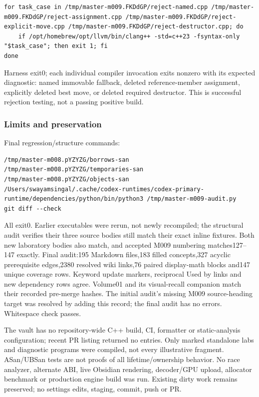 \begin{verbatim}
for task_case in /tmp/master-m009.FKDdGP/reject-named.cpp /tmp/master-m009.FKDdGP/reject-assignment.cpp /tmp/master-m009.FKDdGP/reject-explicit-move.cpp /tmp/master-m009.FKDdGP/reject-destructor.cpp; do
    if /opt/homebrew/opt/llvm/bin/clang++ -std=c++23 -fsyntax-only "$task_case"; then exit 1; fi
done
\end{verbatim}

Harness exit0; each individual compiler invocation exits nonzero with its expected diagnostic: named immovable fallback, deleted reference-member assignment, explicitly deleted best move, or deleted required destructor. This is successful rejection testing, not a passing positive build.

\subsubsection{Limits and preservation}\label{appendix-a103e7846d21-limits-and-preservation}

\hypertarget{appendix-a103e7846d21-limits-and-preservation}{}

Final regression/structure commands:

\begin{verbatim}
/tmp/master-m008.pYZYZG/borrows-san
/tmp/master-m008.pYZYZG/temporaries-san
/tmp/master-m008.pYZYZG/objects-san
/Users/swayamsingal/.cache/codex-runtimes/codex-primary-runtime/dependencies/python/bin/python3 /tmp/master-m009-audit.py
git diff --check
\end{verbatim}

All exit0. Earlier executables were rerun, not newly recompiled; the structural audit verifies their three source bodies still match their exact inline fixtures. Both new laboratory bodies also match, and accepted M009 numbering matches127--147 exactly. Final audit:195 Markdown files,183 filled concepts,327 acyclic prerequisite edges,2380 resolved wiki links,76 paired display-math blocks and147 unique coverage rows. Keyword update markers, reciprocal Used by links and new dependency rows agree. Volume01 and its visual-recall companion match their recorded pre-merge hashes. The initial audit's missing M009 source-heading target was resolved by adding this record; the final audit has no errors. Whitespace check passes.

The vault has no repository-wide C++ build, CI, formatter or static-analysis configuration; recent PR listing returned no entries. Only marked standalone labs and diagnostic programs were compiled, not every illustrative fragment. ASan/UBSan tests are not proofs of all lifetime/ownership behavior. No race analyzer, alternate ABI, live Obsidian rendering, decoder/GPU upload, allocator benchmark or production engine build was run. Existing dirty work remains preserved; no settings edits, staging, commit, push or PR.

